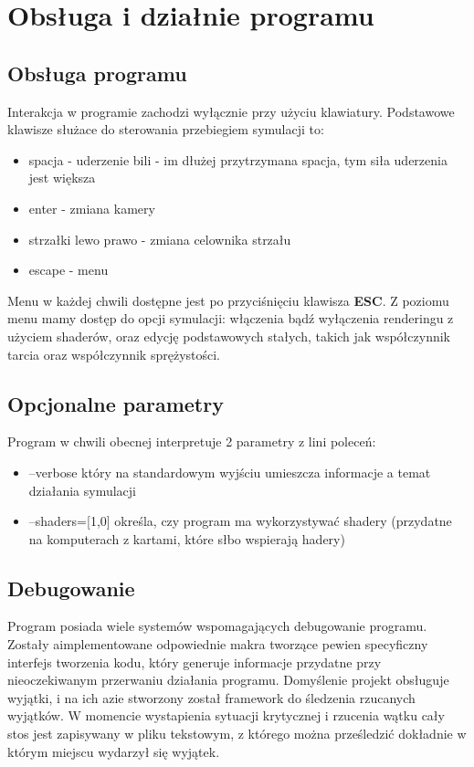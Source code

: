 \section{Obsługa i działnie programu}
\subsection{Obsługa programu}

Interakcja w programie zachodzi wyłącznie przy użyciu klawiatury. 
Podstawowe klawisze służace do sterowania przebiegiem symulacji to:
\begin{itemize}
 \item spacja - uderzenie bili - im dłużej przytrzymana spacja, tym siła uderzenia jest większa
 \item enter - zmiana kamery
 \item strzałki lewo prawo - zmiana celownika strzału
 \item escape - menu
\end{itemize}


Menu w każdej chwili dostępne jest po przyciśnięciu klawisza \textbf{ESC}.
Z poziomu menu mamy dostęp do opcji symulacji: włączenia bądź wyłączenia renderingu z użyciem shaderów, oraz
edycję podstawowych stałych, takich jak współczynnik tarcia oraz współczynnik sprężystości.

\subsection{Opcjonalne parametry}

Program w chwili obecnej interpretuje 2 parametry z lini poleceń:
\begin{itemize}
 \item --verbose który na standardowym wyjściu umieszcza informacje a temat działania symulacji
 \item --shaders=[1,0] określa, czy program ma wykorzystywać shadery (przydatne na komputerach z kartami, które słbo wspierają hadery) 
\end{itemize}

\subsection{Debugowanie}

Program posiada wiele systemów wspomagających debugowanie programu. Zostały aimplementowane odpowiednie makra tworzące
pewien specyficzny interfejs tworzenia kodu, który generuje informacje przydatne przy nieoczekiwanym przerwaniu działania programu. Domyślenie projekt obsługuje wyjątki, i na ich azie stworzony został framework do śledzenia rzucanych wyjątków. W momencie wystapienia sytuacji krytycznej i rzucenia wątku cały stos jest zapisywany w pliku tekstowym, z którego można prześledzić dokładnie w którym miejscu wydarzył się wyjątek.